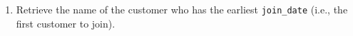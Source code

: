 \documentclass[12pt,a4paper]{article}
\begin{document}
\begin{enumerate}



    \item Retrieve the name of the customer who has the earliest \texttt{join\_date} (i.e., the first customer to join).






\end{enumerate}
\end{document}
